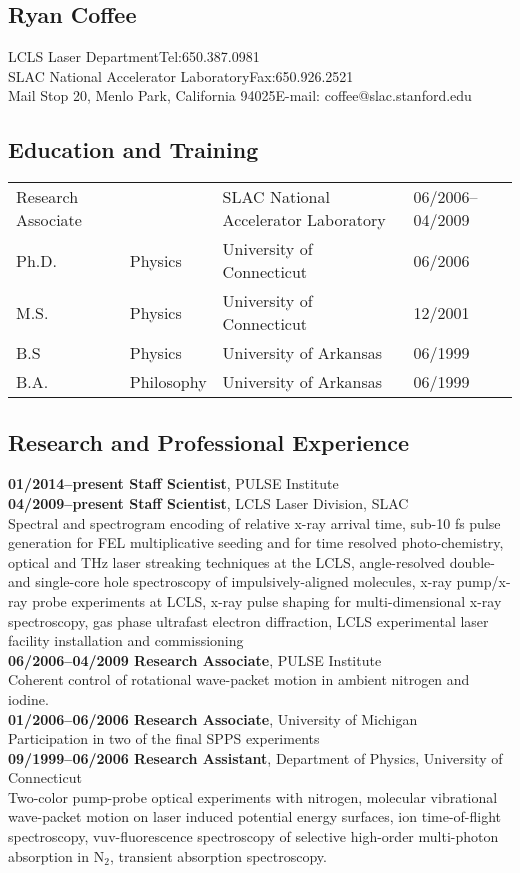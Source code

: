 \subsection*{Ryan Coffee}
LCLS Laser Department\hfill Tel:650.387.0981\\
SLAC National Accelerator Laboratory\hfill Fax:650.926.2521\\
Mail Stop 20, Menlo Park, California  94025\hfill E-mail: coffee@slac.stanford.edu\\

\subsection*{Education and Training}
\begin{tabular}{llll}
Research Associate & & SLAC National Accelerator Laboratory & 06/2006--04/2009\\
Ph.D. & Physics & University of Connecticut & 06/2006\\
M.S. & Physics & University of Connecticut & 12/2001\\
B.S & Physics & University of Arkansas & 06/1999\\
B.A. & Philosophy & University of Arkansas & 06/1999
\end{tabular}

\subsection*{Research and Professional Experience}
\textbf{01/2014--present Staff Scientist}, PULSE Institute\\
\textbf{04/2009--present Staff Scientist}, LCLS Laser Division, SLAC\\
Spectral and spectrogram encoding of relative x-ray arrival time, 
sub-10 fs pulse generation for FEL multiplicative seeding and for time resolved photo-chemistry, 
optical and THz laser streaking techniques at the LCLS, 
angle-resolved double- and single-core hole spectroscopy of impulsively-aligned molecules, 
x-ray pump/x-ray probe experiments at LCLS, 
x-ray pulse shaping for multi-dimensional x-ray spectroscopy, 
gas phase ultrafast electron diffraction, 
LCLS experimental laser facility installation and commissioning\\
\textbf{06/2006--04/2009 Research Associate}, PULSE Institute\\
Coherent control of rotational wave-packet motion in ambient nitrogen and iodine.\\
\textbf{01/2006--06/2006 Research Associate}, University of Michigan\\
Participation in two of the final SPPS experiments\\
\textbf{09/1999--06/2006 Research Assistant}, Department of Physics, University of Connecticut\\
Two-color pump-probe optical experiments with nitrogen, 
molecular vibrational wave-packet motion on laser induced potential energy surfaces, 
ion time-of-flight spectroscopy, 
vuv-fluorescence spectroscopy of selective high-order multi-photon absorption in N$_2$, 
transient absorption spectroscopy.


